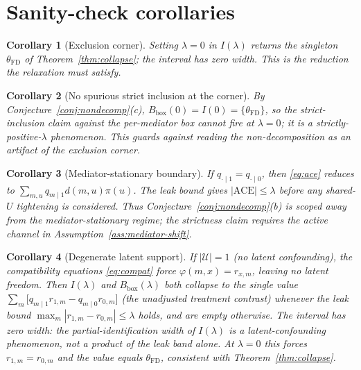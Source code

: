 \documentclass[11pt]{article}
\theoremstyle{definition}
\theoremstyle{plain}
\newtheorem{corollary}{Corollary}
\theoremstyle{remark}
\begin{document}
\section{Sanity-check corollaries}
\label{sec:sanity}
\begin{corollary}[Exclusion corner]\label{cor:corner}
Setting $\lambda=0$ in $I(\lambda)$ returns the singleton $\theta_{\mathrm{FD}}$ of
Theorem~\ref{thm:collapse}; the interval has zero width. This is the reduction the relaxation must satisfy.
\end{corollary}
\begin{corollary}[No spurious strict inclusion at the corner]\label{cor:noshift}
By Conjecture~\ref{conj:nondecomp}(c), $B_{\mathrm{box}}(0)=I(0)=\{\theta_{\mathrm{FD}}\}$, so the
strict-inclusion claim against the per-mediator box cannot fire at $\lambda=0$; it is a
strictly-positive-$\lambda$ phenomenon. This guards against reading the non-decomposition as an artifact of
the exclusion corner.
\end{corollary}
\begin{corollary}[Mediator-stationary boundary]\label{cor:stationary-mediator}
If $q_{\cdot\mid1}=q_{\cdot\mid0}$, then \eqref{eq:ace} reduces to
$\sum_{m,u}q_{m\mid1}d(m,u)\pi(u)$. The leak bound gives
$|\mathrm{ACE}|\le\lambda$ before any shared-$U$ tightening is considered. Thus
Conjecture~\ref{conj:nondecomp}(b) is scoped away from the mediator-stationary regime; the strictness
claim requires the active channel in Assumption~\ref{ass:mediator-shift}.
\end{corollary}
\begin{corollary}[Degenerate latent support]\label{cor:degenerate}
If $|\mathcal U|=1$ (no latent confounding), the compatibility equations \eqref{eq:compat} force
$\varphi(m,x)=r_{x,m}$, leaving no latent freedom. Then $I(\lambda)$ and $B_{\mathrm{box}}(\lambda)$ both
collapse to the single value $\sum_m\bigl[q_{m\mid1}r_{1,m}-q_{m\mid0}r_{0,m}\bigr]$ (the unadjusted
treatment contrast) whenever the leak bound $\max_m|r_{1,m}-r_{0,m}|\le\lambda$ holds, and are empty
otherwise. The interval has zero width: the partial-identification width of $I(\lambda)$ is a
latent-confounding phenomenon, not a product of the leak band alone. At $\lambda=0$ this forces
$r_{1,m}=r_{0,m}$ and the value equals $\theta_{\mathrm{FD}}$, consistent with Theorem~\ref{thm:collapse}.
\end{corollary}
\end{document}
